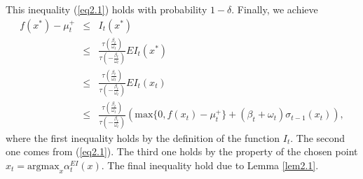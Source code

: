 \documentclass[twoside]{article}
\newenvironment{proof*}[1][\proofname]{
  \renewcommand\qedsymbol{\rule{2.5mm}{2.5mm}}
  \begin{proof}[#1]}{\end{proof}}
\begin{document}
\begin{proof*}
This inequality (\ref{eq2.1}) holds with probability $ 1 -\delta$. Finally, we achieve
\begin{eqnarray*}
f(x^*) - \mu_t^+ & \le & I_t(x^*) \\
& \le & \frac{\tau(\frac{\beta_t}{\omega_t})}{ \tau(-\frac{\beta_t}{\omega_t})}EI_{t}(x^*) \\
& \le & \frac{\tau(\frac{\beta_t}{\omega_t})}{ \tau(-\frac{\beta_t}{\omega_t})}EI_{t}(x_{t}) \\
& \le & \frac{\tau(\frac{\beta_t}{\omega_t})}{ \tau(-\frac{\beta_t}{\omega_t})}( \text{max}\{0, f(x_{t}) - \mu_t^+\} + (\beta_t+ \omega_t)\sigma_{t-1}(x_{t})),
\end{eqnarray*}
where the first inequality holds by the definition of the function $I_t$. The second one comes from (\ref{eq2.1}). The third one holds by the property of the chosen point $x_{t} = \text{argmax}_{x} \alpha_t^{EI}(x)$. The final inequality hold due to Lemma \ref{lem2.1}.
\end{proof*}
\end{document}
